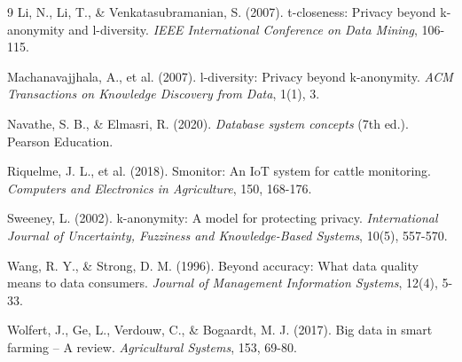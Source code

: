 \begin{thebibliography}{9}
Li, N., Li, T., \& Venkatasubramanian, S. (2007).
t-closeness: Privacy beyond k-anonymity and l-diversity.
\textit{IEEE International Conference on Data Mining}, 106-115.

Machanavajjhala, A., et al. (2007).
l-diversity: Privacy beyond k-anonymity.
\textit{ACM Transactions on Knowledge Discovery from Data}, 1(1), 3.

Navathe, S. B., \& Elmasri, R. (2020).
\textit{Database system concepts} (7th ed.).
Pearson Education.

Riquelme, J. L., et al. (2018).
Smonitor: An IoT system for cattle monitoring.
\textit{Computers and Electronics in Agriculture}, 150, 168-176.

Sweeney, L. (2002).
k-anonymity: A model for protecting privacy.
\textit{International Journal of Uncertainty, Fuzziness and Knowledge-Based Systems}, 10(5), 557-570.

Wang, R. Y., \& Strong, D. M. (1996).
Beyond accuracy: What data quality means to data consumers.
\textit{Journal of Management Information Systems}, 12(4), 5-33.

Wolfert, J., Ge, L., Verdouw, C., \& Bogaardt, M. J. (2017).
Big data in smart farming – A review.
\textit{Agricultural Systems}, 153, 69-80.

\end{thebibliography}
